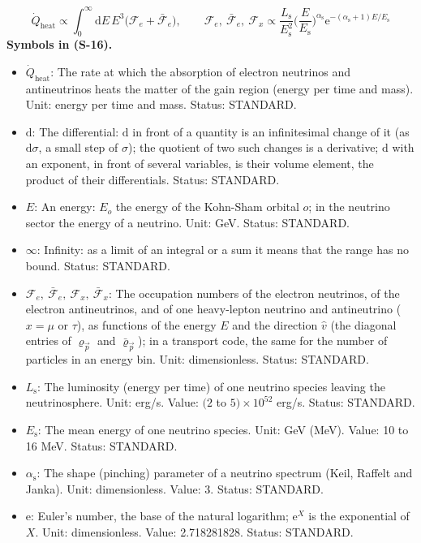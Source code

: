 \documentclass[
  10pt,
]{article}
\providecommand{\tightlist}{%
  \setlength{\itemsep}{0pt}\setlength{\parskip}{0pt}}
\begin{document}
\[
\dot Q_{\mathrm{heat}} \propto \int_0^\infty\mathrm{d}E\,E^3\big(\mathcal{F}_{e} + \bar{\mathcal{F}}_{e}\big),\qquad
\mathcal{F}_{e},\ \bar{\mathcal{F}}_{e},\ \mathcal{F}_{x} \propto \frac{L_{\mathrm{s}}}{E_{\mathrm{s}}^2}\Big(\frac{E}{E_{\mathrm{s}}}\Big)^{\alpha_{\mathrm{s}}}\mathrm{e}^{-(\alpha_{\mathrm{s}} + 1)E/E_{\mathrm{s}}} \tag{S-16}
\] \textbf{Symbols in (S-16).}

\begin{itemize}
\tightlist
\item
  \(\dot Q_{\mathrm{heat}}\): The rate at which the absorption of
  electron neutrinos and antineutrinos heats the matter of the gain
  region (energy per time and mass). Unit: energy per time and mass.
  Status: STANDARD.
\item
  \(\mathrm{d}\): The differential: \(\mathrm{d}\) in front of a
  quantity is an infinitesimal change of it (as \(\mathrm{d}\sigma\), a
  small step of \(\sigma\)); the quotient of two such changes is a
  derivative; \(\mathrm{d}\) with an exponent, in front of several
  variables, is their volume element, the product of their
  differentials. Status: STANDARD.
\item
  \(E\): An energy: \(E_o\) the energy of the Kohn-Sham orbital \(o\);
  in the neutrino sector the energy of a neutrino. Unit: GeV. Status:
  STANDARD.
\item
  \(\infty\): Infinity: as a limit of an integral or a sum it means that
  the range has no bound. Status: STANDARD.
\item
  \(\mathcal{F}_{e},\ \bar{\mathcal{F}}_{e},\ \mathcal{F}_{x},\ \bar{\mathcal{F}}_{x}\):
  The occupation numbers of the electron neutrinos, of the electron
  antineutrinos, and of one heavy-lepton neutrino and antineutrino
  (\(x = \mu\) or \(\tau\)), as functions of the energy \(E\) and the
  direction \(\hat v\) (the diagonal entries of \(\varrho_{\vec p}\) and
  \(\bar\varrho_{\vec p}\)); in a transport code, the same for the
  number of particles in an energy bin. Unit: dimensionless. Status:
  STANDARD.
\item
  \(L_{\mathrm{s}}\): The luminosity (energy per time) of one neutrino
  species leaving the neutrinosphere. Unit: erg/s. Value: \((2\) to
  \(5)\times10^{52}\) erg/s. Status: STANDARD.
\item
  \(E_{\mathrm{s}}\): The mean energy of one neutrino species. Unit: GeV
  (MeV). Value: 10 to 16 MeV. Status: STANDARD.
\item
  \(\alpha_{\mathrm{s}}\): The shape (pinching) parameter of a neutrino
  spectrum (Keil, Raffelt and Janka). Unit: dimensionless. Value: 3.
  Status: STANDARD.
\item
  \(\mathrm{e}\): Euler's number, the base of the natural logarithm;
  \(\mathrm{e}^{X}\) is the exponential of \(X\). Unit: dimensionless.
  Value: 2.718281828. Status: STANDARD.
\end{itemize}
\end{document}
